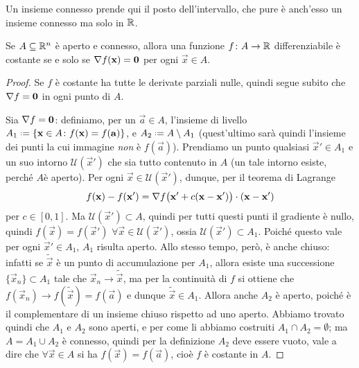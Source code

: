 Un insieme connesso prende qui il posto dell'intervallo, che pure è anch'esso un insieme connesso ma solo in $\mathbb{R}$.
\begin{corollario}
	Se $A\subseteq\mathbb{R}^n$ è aperto e connesso, allora una funzione $f\colon A\to\mathbb{R}$ differenziabile è costante se e solo se $\nabla f(\mathbf{x})=\mathbf{0}$ per ogni $\vec x\in A$.
\end{corollario}
\begin{proof}
	Se $f$ è costante ha tutte le derivate parziali nulle, quindi segue subito che $\nabla f=\mathbf{0}$ in ogni punto di $A$.

	Sia $\nabla f=\mathbf{0}$: definiamo, per un $\vec a\in A$, l'insieme di livello $A_1\defeq\{\vec x\in A\colon f(\vec x)=f(\vec a)\}$, e $A_2\defeq A\setminus A_1$ (quest'ultimo sarà quindi l'insieme dei punti la cui immagine \emph{non} è $f(\vec a)$).
	Prendiamo un punto qualsiasi $\vec x'\in A_1$ e un suo intorno $\mathcal U(\vec x')$ che sia tutto contenuto in $A$ (un tale intorno esiste, perch\'e $A$è aperto).
	Per ogni $\vec x\in\mathcal U(\vec x')$, dunque, per il teorema di Lagrange
	\begin{equation*}
		f(\mathbf{x})-f(\mathbf{x}')={\nabla f\big(\mathbf{x}'+c(\mathbf{x}-\mathbf{x}')\big)}\cdot{(\mathbf{x}-\mathbf{x}')}
	\end{equation*}
	per $c\in[0,1]$.
	Ma $\mathcal U(\vec x')\subset A$, quindi per tutti questi punti il gradiente è nullo, quindi $f(\vec x)=f(\vec x')$ $\forall\vec x\in\mathcal U(\vec x')$, ossia $\mathcal U(\vec x')\subset A_1$.
	Poich\'e questo vale per ogni $\vec x'\in A_1$, $A_1$ risulta aperto.
	Allo stesso tempo, però, è anche chiuso: infatti se $\tilde{\vec x}$ è un punto di accumulazione per $A_1$, allora esiste una successione $\{\vec x_n\}\subset A_1$ tale che $\vec x_n\to\tilde{\vec x}$, ma per la continuità di $f$ si ottiene che $f(\vec x_n)\to f(\tilde{\vec x})=f(\vec a)$ e dunque $\tilde{\vec x}\in A_1$.
	Allora anche $A_2$ è aperto, poich\'e è il complementare di un insieme chiuso rispetto ad uno aperto.
	Abbiamo trovato quindi che $A_1$ e $A_2$ sono aperti, e per come li abbiamo costruiti $A_1\cap A_2=\emptyset$; ma $A=A_1\cup A_2$ è connesso, quindi per la definizione $A_2$ deve essere vuoto, vale a dire che $\forall \vec x\in A$ si ha $f(\vec x)=f(\vec a)$, cioè $f$ è costante in $A$.
\end{proof}

